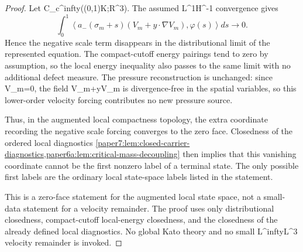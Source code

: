 \documentclass[11pt]{amsart}
\def\({}%
\def\){}%
\def\mathbb#1{#1}%
\def\infty{infty}%
\theoremstyle{plain}
\theoremstyle{definition}
\theoremstyle{remark}
\begin{document}
\begin{proof}
Let \(\varphi\in C_c^\infty((0,1)\times K;\mathbb R^3)\).  The assumed
\(L^1H^{-1}\) convergence gives
\[
  \int_0^1
  \left\langle
  a_-(\sigma_m+s)(V_m+y\cdot\nabla V_m),\varphi(s)
  \right\rangle ds
  \longrightarrow0 .
\]
Hence the negative scale term disappears in the distributional limit of the
represented equation.  The compact-cutoff energy pairings tend to zero by
assumption, so the local energy inequality also passes to the same limit with
no additional defect measure.  The pressure reconstruction is unchanged: since
\(\nabla\cdot V_m=0\), the field \(V_m+y\cdot\nabla V_m\) is divergence-free
in the spatial variables, so this lower-order velocity forcing contributes no
new pressure source.
\par
Thus, in the augmented local compactness topology, the extra coordinate
recording the negative scale forcing converges to the zero face.  Closedness of
the ordered local diagnostics
\cref{paper7:lem:closed-carrier-diagnostics,paper6a:lem:critical-mass-decoupling}
then implies that this vanishing coordinate cannot be the first nonzero label
of a terminal state.  The only possible first labels are the ordinary local
state-space labels listed in the statement.
\par
This is a zero-face statement for the augmented local state space, not a
small-data statement for a velocity remainder.  The proof uses only
distributional closedness, compact-cutoff local-energy closedness, and the
closedness of the already defined local diagnostics.  No global Kato theory and
no small \(L^\infty L^3\) velocity remainder is invoked.
\end{proof}
\end{document}
